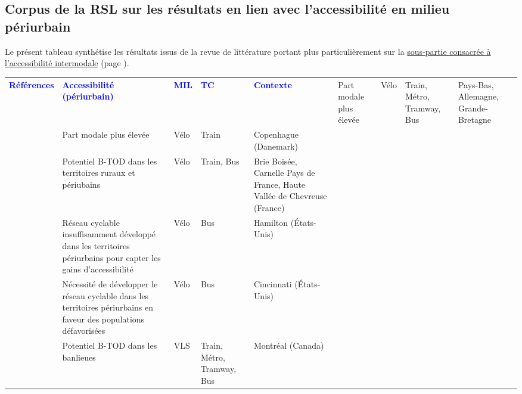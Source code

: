     \newpage
\subsection{Corpus de la \acrshort{RSL} sur les résultats en lien avec l'accessibilité en milieu \gls{périurbain}}
    \label{donnees-ouvertes:rsl_resultats_accessibilite_periurbain}

Le présent tableau synthétise les résultats issus de la revue de littérature portant plus particulièrement sur la \hyperref[Accessibilité intermodale]{sous-partie consacrée à l'accessibilité intermodale} (page \pageref{Accessibilité intermodale}).\par

        \begin{longtable}{p{3cm}p{4cm}p{1.5cm}p{1.8cm}p{2.3cm}}
        \hline
        \textcolor{blue}{\textbf{Références}} & \textcolor{blue}{\textbf{Accessibilité (périurbain)}} & \textcolor{blue}{\textbf{MIL}} & \textcolor{blue}{\textbf{TC}} & \textcolor{blue}{\textbf{Contexte}}
        \hline
        \endhead
    \small{\textcite{martens_bicycle_2004}} & \small{Part modale plus élevée} & \small{Vélo} & \small{Train, Métro, Tramway, Bus} & \small{Pays-Bas, Allemagne, Grande-Bretagne}\\
    \small{\textcite{halldorsdottir_home-end_2017}} & \small{Part modale plus élevée} & \small{Vélo} & \small{Train} & \small{Copenhague (Danemark)}\\
    \small{\textcite{stransky_periurbain_2019}} & \small{Potentiel \acrshort{B-TOD} dans les territoires ruraux et périubains} & \small{Vélo} & \small{Train, Bus} & \small{Brie Boisée, Carnelle Pays de France, Haute Vallée de Chevreuse (France)}\\
    \small{\textcite{zuo_incorporating_2021}} & \small{Réseau cyclable insuffisamment développé dans les territoires périurbains pour capter les gains d'accessibilité} & \small{Vélo} & \small{Bus} & \small{Hamilton (États-Unis)}\\
    \small{\textcite{zuo_determining_2018}} & \small{Nécessité de développer le réseau cyclable dans les territoires périurbains en faveur des populations défavorisées} & \small{Vélo} & \small{Bus} & \small{Cincinnati (États-Unis)}\\
    \small{\textcite{bachand-marleau_much-anticipated_2011}} & \small{Potentiel \acrshort{B-TOD} dans les banlieues} & \small{VLS} & \small{Train, Métro, Tramway, Bus} & \small{Montréal (Canada)}\\

\end{longtable}
